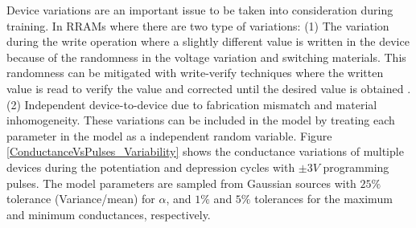 \documentclass[english]{article}
\renewcommand{\cite}{\citep}
\begin{document}
%
Device variations are an important issue to be taken into consideration during training.
In RRAMs where there are two type of variations: 
(1) The variation during the write operation where a slightly different value is written in the device because of the randomness in the voltage variation and switching materials.
This randomness can be mitigated with write-verify techniques where the written value is read to verify the value and corrected until the desired value is obtained \cite{puglisi2015novel}.
(2) Independent device-to-device due to fabrication mismatch and material inhomogeneity.
These variations can be included in the model by treating each parameter in the model as a independent random variable. Figure \ref{ConductanceVsPulses_Variability} shows the conductance variations of multiple devices during the potentiation and depression cycles with $\pm 3V$ programming pulses. 
The model parameters are sampled from Gaussian sources with $25\%$ tolerance (Variance/mean) for $\alpha$, and $1\%$ and $5\%$ tolerances for the maximum and minimum conductances, respectively. 
\end{document}
